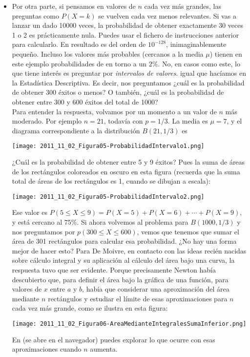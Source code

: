 \begin{itemize}

    \item Por otra parte, si pensamos en valores de $n$ cada vez más grandes, las preguntas como $P(X=k)$ se vuelven cada vez menos relevantes. Si vas a lanzar un dado 10000 veces, la probabilidad de obtener exactamente $30$ veces 1 o 2 es prácticamente nula. Puedes usar el fichero de instrucciones anterior para calcularlo. En resultado es del orden de $10^{-128}$, inimaginablemente pequeño. Incluso los valores más probables (cercanos a la media $\mu$) tienen en este ejemplo  probabilidades de en torno a un $2\%$.  No, en casos como este, lo que tiene interés es preguntar por {\em intervalos de valores}. igual que hacíamos en la Estadística Descriptiva. Es decir, nos preguntamos ¿cuál es la probabilidad de obtener 300 éxitos o menos? O también, ¿cuál es la probabilidad de obtener entre 300 y 600 éxitos del total de 1000?\\

        Para entender la respuesta, volvamos por un momento a un valor de $n$ más moderado. Por ejemplo $n=21$, todavía con $p=1/3$. La media es $\mu=7$, y el diagrama correspondiente a la distribución $B(21,1/3)$ es
        \begin{center}
        \texttt{[image: 2011\_11\_02\_Figura05-ProbabilidadIntervalo1.png]}
        \end{center}
        ¿Cuál es la probabilidad de obtener entre 5 y 9 éxitos? Pues la suma de áreas de los rectángulos coloreados en oscuro en esta figura (recuerda que la suma total de áreas de los rectángulos es 1, cuando se dibujan a escala):
        \begin{center}
        \texttt{[image: 2011\_11\_02\_Figura05-ProbabilidadIntervalo2.png]}
        \end{center}
        Ese valor es $P(5\leq X\leq 9)=P(X=5)+P(X=6)+\cdots+P(X=9)$, y está cercano al $75\%$. Si ahora volvemos al problema para $B(1000,1/3)$  y nos preguntamos por $p(300\leq X\leq 600)$, vemos que tenemos que sumar el área de 301 rectángulos para calcular esa probabilidad. ¿No hay una forma mejor de hacer esto? Para De Moivre, en contacto con las ideas recién nacidas sobre cálculo integral y su aplicación al cálculo del área bajo una curva, la respuesta tuvo que ser evidente. Porque precisamente Newton había descubierto que, para definir el área bajo la gráfica de una función, para valores de $x$ entre $a$ y $b$, había que considerar una aproximación del área mediante $n$ rectángulos y estudiar el límite de esas aproximaciones para $n$ cada vez más grande, como se ilustra en esta figura:
        \begin{center}
        \texttt{[image: 2011\_11\_02\_Figura06-AreaMedianteIntegralesSumaInferior.png]}
        \end{center}
        En  (se abre en el navegador) puedes explorar lo que ocurre con esas aproximaciones cuando $n$ aumenta.


\end{itemize}
